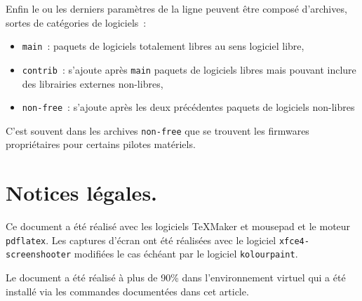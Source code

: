 \documentclass[12pt, a4paper]{report}
\renewcommand{\baselinestretch}{1.5}
\renewcommand{\baselinestretch}{1.25}
\renewcommand{\baselinestretch}{1.25}
\begin{document}
Enfin le ou les derniers paramètres de la ligne peuvent être composé d'archives, sortes de catégories de logiciels~:
\begin{itemize}
	\item \texttt{main}~: paquets de logiciels totalement libres au sens logiciel libre,
	\item \texttt{contrib}~: s'ajoute après \texttt{main} paquets de logiciels libres mais pouvant inclure des librairies externes non-libres,
	\item \texttt{non-free}~: s'ajoute après les deux précédentes paquets de logiciels non-libres
\end{itemize}
C'est souvent dans les archives \texttt{non-free} que se trouvent les firmwares propriétaires pour certains pilotes matériels.

\chapter{Notices légales.}
Ce document a été réalisé avec les logiciels \TeX{}Maker et mousepad et le moteur \texttt{pdflatex}. 
Les captures d'écran ont été réalisées avec le logiciel \texttt{xfce4-screenshooter} modifiées le cas échéant par le logiciel \texttt{kolourpaint}.

Le document a été réalisé à plus de 90\%{} dans l'environnement virtuel qui a été installé via les commandes documentées dans cet article.

\vspace{2cm}

\renewcommand{\baselinestretch}{1}
\setlength{\parskip}{0em}
\tableofcontents
\end{document}
